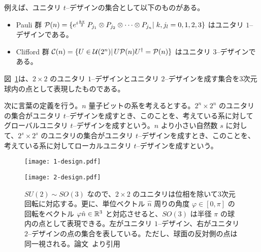 例えば、ユニタリ $t$--デザインの集合として以下のものがある。
\begin{itemize}
    \item Pauli 群 $\mathcal{P}(n)=\{e^{i\frac{k\pi}{2}}\, P_{j_1}\otimes P_{j_2}\otimes \cdots\otimes P_{j_n}|\;k,j_l=0,1,2,3\}$ はユニタリ $1$--デザインである。
    \item Clifford 群 $\mathcal{C}(n)=\{U\in \mathcal{U}(2^n)|\,U\mathcal{P}(n)U^\dagger = \mathcal{P}(n)\}$ はユニタリ $3$--デザインである。
\end{itemize}

図~\ref{fig:design}は、$2\times2$ のユニタリ $1$--デザインとユニタリ $2$--デザインを成す集合を3次元球内の点として表現したものである\cite{gross2007evenly}。

次に言葉の定義を行う。$n$ 量子ビットの系を考えるとする。$2^n \times 2^n$ のユニタリの集合がユニタリ $t$--デザインを成すとき、このことを、考えている系に対してグローバルユニタリ $t$--デザインを成すという。$n$ より小さい自然数 $s$ に対して、$2^s \times 2^s$ のユニタリの集合がユニタリ $t$--デザインを成すとき、このことを、考えている系に対してローカルユニタリ $t$--デザインを成すという。

\begin{figure}[H]
    \begin{minipage}[b]{0.5\columnwidth}
        \centering
        \texttt{[image: 1-design.pdf]}
    \end{minipage}
    \hspace{0\columnwidth}
    \begin{minipage}[b]{0.5\columnwidth}
        \centering
        \texttt{[image: 2-design.pdf]}
    \end{minipage}
    \caption{$SU(2) \sim SO(3)$ なので、$2\times2$ のユニタリは位相を除いて3次元回転に対応する。更に、単位ベクトル $\hat{n}$ 周りの角度 $\varphi \in [0,\pi] $ の回転をベクトル $\varphi\hat{n} \in \mathbb{R}^3$ と対応させると、$SO(3)$ は半径 $\pi$ の球内の点として表現できる。左がユニタリ $1$--デザイン、右がユニタリ $2$--デザインの点の集合を表している。ただし、球面の反対側の点は同一視される。論文~\cite{gross2007evenly}より引用}
    \label{fig:design}
\end{figure}


